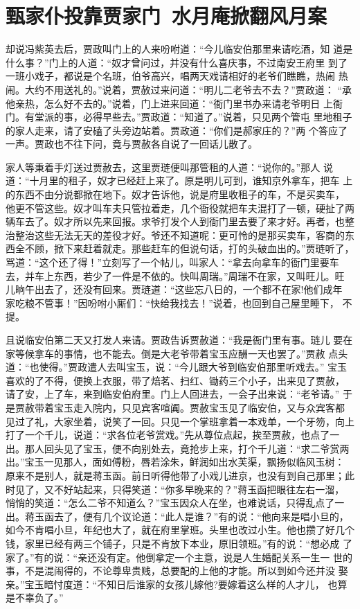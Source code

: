 \chapter{甄家仆投靠贾家门~水月庵掀翻风月案}

却说冯紫英去后，贾政叫门上的人来吩咐道：“今儿临安伯那里来请吃酒，知
道是什么事？”门上的人道：“奴才曾问过，并没有什么喜庆事，不过南安王府里
到了一班小戏子，都说是个名班，伯爷高兴，唱两天戏请相好的老爷们瞧瞧，热闹
热闹。大约不用送礼的。”说着，贾赦过来问道：“明儿二老爷去不去？”贾政道：
“承他亲热，怎么好不去的。”说着，门上进来回道：“衙门里书办来请老爷明日
上衙门。有堂派的事，必得早些去。”贾政道：“知道了。”说着，只见两个管屯
里地租子的家人走来，请了安磕了头旁边站着。贾政道：“你们是郝家庄的？”两
个答应了一声。贾政也不往下问，竟与贾赦各自说了一回话儿散了。

家人等秉着手灯送过贾赦去，这里贾琏便叫那管租的人道：“说你的。”那人
说道：“十月里的租子，奴才已经赶上来了。原是明儿可到，谁知京外拿车，把车
上的东西不由分说都掀在地下。奴才告诉他，说是府里收租子的车，不是买卖车，
他更不管这些。奴才叫车夫只管拉着走，几个衙役就把车夫混打了一顿，硬扯了两
辆车去了。奴才所以先来回报。求爷打发个人到衙门里去要了来才好。再者，也整
治整治这些无法无天的差役才好。爷还不知道呢：更可怜的是那买卖车，客商的东
西全不顾，掀下来赶着就走。那些赶车的但说句话，打的头破血出的。”贾琏听了，
骂道：“这个还了得！”立刻写了一个帖儿，叫家人：“拿去向拿车的衙门里要车
去，并车上东西，若少了一件是不依的。快叫周瑞。”周瑞不在家，又叫旺儿。旺
儿晌午出去了，还没有回来。贾琏道：“这些忘八日的，一个都不在家!他们成年
家吃粮不管事！”因吩咐小厮们：“快给我找去！”说着，也回到自己屋里睡下，
不提。

且说临安伯第二天又打发人来请。贾政告诉贾赦道：“我是衙门里有事。琏儿
要在家等候拿车的事情，也不能去。倒是大老爷带着宝玉应酬一天也罢了。”贾赦
点头道：“也使得。”贾政遣人去叫宝玉，说：“今儿跟大爷到临安伯那里听戏去。”
宝玉喜欢的了不得，便换上衣服，带了焙茗、扫红、锄药三个小子，出来见了贾赦，
请了安，上了车，来到临安伯府里。门上人回进去，一会子出来说：“老爷请。”
于是贾赦带着宝玉走入院内，只见宾客喧阗。贾赦宝玉见了临安伯，又与众宾客都
见过了礼，大家坐着，说笑了一回。只见一个掌班拿着一本戏单，一个牙笏，向上
打了一个千儿，说道：“求各位老爷赏戏。”先从尊位点起，挨至贾赦，也点了一
出。那人回头见了宝玉，便不向别处去，竟抢步上来，打个千儿道：“求二爷赏两
出。”宝玉一见那人，面如傅粉，唇若涂朱，鲜润如出水芙渠，飘扬似临风玉树：
原来不是别人，就是蒋玉函。前日听得他带了小戏儿进京，也没有到自己那里；此
时见了，又不好站起来，只得笑道：“你多早晚来的？”蒋玉函把眼往左右一溜，
悄悄的笑道：“怎么二爷不知道么？”宝玉因众人在坐，也难说话，只得乱点了一
出。蒋玉函去了，便有几个议论道：“此人是谁？”有的说：“他向来是唱小旦的，
如今不肯唱小旦，年纪也大了，就在府里掌班。头里也改过小生。他也攒了好几个
钱，家里已经有两三个铺子，只是不肯放下本业，原旧领班。”有的说：“想必成
了家了。”有的说：“亲还没有定。他倒拿定一个主意，说是人生婚配关系一生一
世的事，不是混闹得的，不论尊卑贵贱，总要配的上他的才能。所以到如今还并没
娶亲。”宝玉暗忖度道：“不知日后谁家的女孩儿嫁他?要嫁着这么样的人才儿，
也算是不辜负了。”

